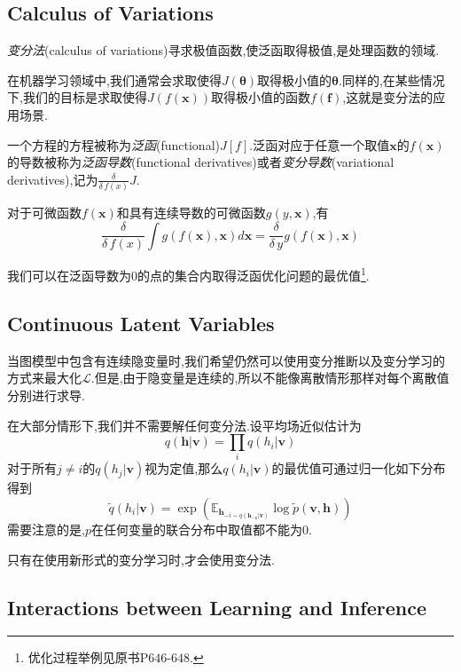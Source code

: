 \subsection{Calculus of Variations}

\textit{变分法}(calculus of variations)寻求极值函数,使泛函取得极值,是处理函数的领域.

在机器学习领域中,我们通常会求取使得$J(\bm\theta)$取得极小值的$\bm\theta$.同样的,在某些情况下,我们的目标是求取使得$J(f(\bm x))$取得极小值的函数$f(\bm f)$,这就是变分法的应用场景.

一个方程的方程被称为\textit{泛函}(functional)$J[f]$.泛函对应于任意一个取值$\bm x$的$f(\bm x)$的导数被称为\textit{泛函导数}(functional derivatives)或者\textit{变分导数}(variational derivatives),记为$\frac{\delta}{\delta\,f(x)}J$.

对于可微函数$f(\bm x)$和具有连续导数的可微函数$g(y,\bm x)$,有
\begin{equation}
\frac{\delta}{\delta\,f(x)}\int g(f(\bm x),\bm x)d\bm x=\frac{\delta}{\delta\,y}g(f(\bm x),\bm x)
\end{equation}

我们可以在泛函导数为$0$的点的集合内取得泛函优化问题的最优值\footnote{优化过程举例见原书P$646$-$648$.}.

\subsection{Continuous Latent Variables}

当图模型中包含有连续隐变量时,我们希望仍然可以使用变分推断以及变分学习的方式来最大化$\mathcal L$.但是,由于隐变量是连续的,所以不能像离散情形那样对每个离散值分别进行求导.

在大部分情形下,我们并不需要解任何变分法.设平均场近似估计为
\begin{equation}
q(\bm{h|v})=\prod_iq(h_i|\bm v)
\end{equation}
对于所有$j\ne i$的$q(h_j|\bm v)$视为定值,那么$q(h_i|\bm v)$的最优值可通过归一化如下分布得到
\begin{equation}
\tilde q(h_i|\bm v)=\exp(\mathbb E_{\bm h_{-i\sim q(\bm{h_{-1}|v})}}\log\tilde p(\bm{v,h}))
\end{equation}
需要注意的是,$p$在任何变量的联合分布中取值都不能为$0$.

只有在使用新形式的变分学习时,才会使用变分法.

\subsection{Interactions between Learning and Inference}

